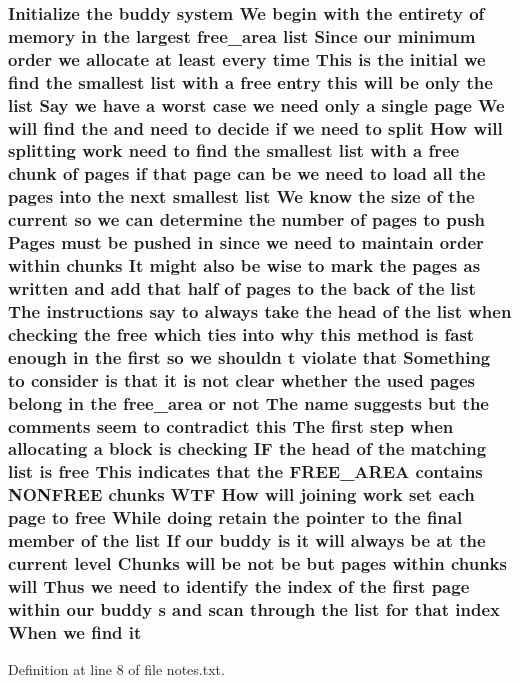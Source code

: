 \subsubsection[{\texorpdfstring{it}{it}}]{\setlength{\rightskip}{0pt plus 5cm}Initialize the buddy system We begin with the entirety of memory {\bf in} the largest {\bf free\+\_\+area} {\bf list} Since our minimum {\bf order} we allocate at least every time This {\bf is} the initial we find the smallest {\bf list} with a free entry this will be only the {\bf list} Say we have a worst case we need only a single {\bf page} We will find the and need to decide if we need to {\bf split} How will splitting work need to find the smallest {\bf list} with a free {\bf chunk} of {\bf pages} if that {\bf page} can be we need to load all the {\bf pages} into the next smallest {\bf list} We know the size of the current {\bf so} we can determine the number of {\bf pages} to push Pages must be pushed {\bf in} since we need to maintain {\bf order} within chunks It might also be wise to mark the {\bf pages} as written and add that half of {\bf pages} to the back of the {\bf list} The instructions say to always take the head of the {\bf list} when checking the free which ties into why this method {\bf is} fast enough {\bf in} the {\bf first} {\bf so} we shouldn t violate that Something to consider {\bf is} that it {\bf is} {\bf not} clear whether the used {\bf pages} belong {\bf in} the {\bf free\+\_\+area} or {\bf not} The name suggests but the comments seem to contradict this The {\bf first} step when allocating a block {\bf is} checking IF the head of the matching {\bf list} {\bf is} free This indicates that the F\+R\+E\+E\+\_\+\+A\+R\+EA contains N\+O\+N\+F\+R\+EE chunks W\+TF How will joining work set each {\bf page} to free While doing retain the pointer to the final member of the {\bf list} If our buddy {\bf is} it will always be at the current level Chunks will be {\bf not} be but {\bf pages} within chunks will Thus we need to identify the index of the {\bf first} {\bf page} within our buddy s and scan through the {\bf list} for that index When we find it}\hypertarget{notes_8txt_a4ce567c95a3c0db618dea1cb3c81173b}{}\label{notes_8txt_a4ce567c95a3c0db618dea1cb3c81173b}


Definition at line 8 of file notes.\+txt.

